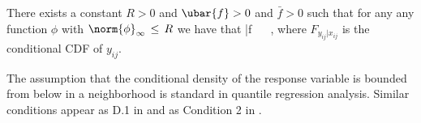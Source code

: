 \documentclass[twoside,11pt]{article}
\begin{document}

\begin{assumption}
\label{assumptionA}
There exists a constant $R > 0$ and $\ubar{f} > 0$  
and $\bar{f} > 0$
such that for any %
any function $\phi$ with $\norm{\phi}_{\infty} \,\le\, R$ we have that
\beq
\bar{f} \,\geq\,  \,\ge\,  ,
\beq     
where $F_{y_{ij}|x_{ij}}$ is the conditional CDF of $y_{ij}$. 
\end{assumption}

The assumption that the conditional density of the response variable is bounded from below in a neighborhood is standard in quantile regression analysis. Similar conditions appear as D.1 in \cite{belloni2011} and as Condition 2 in \cite{he1994convergence}.
\end{document}
